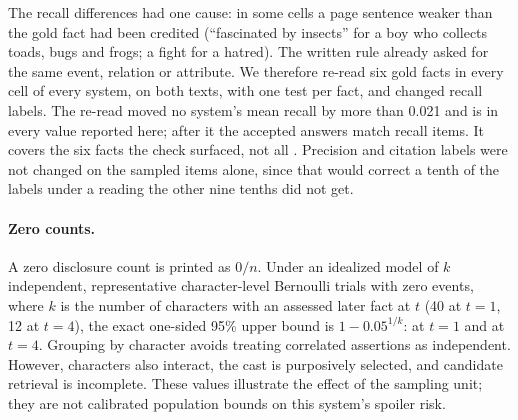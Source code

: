 The recall differences had one cause: in some cells a page sentence weaker than the gold fact
had been credited (``fascinated by insects'' for a boy who collects toads, bugs and frogs; a
fight for a hatred). The written rule already asked for the same event, relation or
attribute. We therefore re-read six gold facts in every cell of every system, on both texts,
with one test per fact, and changed  recall labels. The re-read
moved no system's mean recall by more than 0.021 and is in every value reported here; after
it the accepted answers match  recall items. It covers the six
facts the check surfaced, not all . Precision and citation labels were not
changed on the sampled items alone, since that would correct a tenth of the labels under a
reading the other nine tenths did not get.\fi

\paragraph{Zero counts.} A zero disclosure count is printed as $0/n$. Under an idealized
model of $k$ independent, representative character-level Bernoulli trials with zero events,
where $k$ is the number of characters with an assessed later fact at $t$ (40 at $t=1$, 12
at $t=4$), the exact one-sided 95\% upper bound is $1-0.05^{1/k}$:
 at $t=1$ and  at $t=4$.
Grouping by character avoids treating correlated assertions as independent. However,
characters also interact, the cast is purposively selected, and candidate retrieval is
incomplete. These values illustrate the effect of the sampling unit; they are not
calibrated population bounds on this system's spoiler risk.
